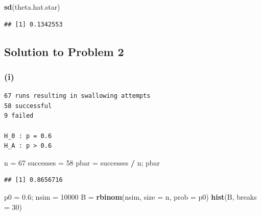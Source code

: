 \documentclass[]{article}
\newenvironment{Shaded}{\begin{snugshade}}{\end{snugshade}}
\newcommand{\DataTypeTok}[1]{\textcolor[rgb]{0.13,0.29,0.53}{#1}}
\newcommand{\DecValTok}[1]{\textcolor[rgb]{0.00,0.00,0.81}{#1}}
\newcommand{\FloatTok}[1]{\textcolor[rgb]{0.00,0.00,0.81}{#1}}
\newcommand{\KeywordTok}[1]{\textcolor[rgb]{0.13,0.29,0.53}{\textbf{#1}}}
\newcommand{\NormalTok}[1]{#1}
\newcommand{\OperatorTok}[1]{\textcolor[rgb]{0.81,0.36,0.00}{\textbf{#1}}}
\newcommand{\StringTok}[1]{\textcolor[rgb]{0.31,0.60,0.02}{#1}}
\begin{document}
\begin{Shaded}
\begin{Highlighting}[]
\KeywordTok{sd}\NormalTok{(theta.hat.star)}
\end{Highlighting}
\end{Shaded}

\begin{verbatim}
## [1] 0.1342553
\end{verbatim}

\hypertarget{solution-to-problem-2}{%
\subsection{Solution to Problem 2}\label{solution-to-problem-2}}

\hypertarget{i-1}{%
\subsubsection{(i)}\label{i-1}}

\begin{verbatim}
67 runs resulting in swallowing attempts
58 successful
9 failed

H_0 : p = 0.6
H_A : p > 0.6

\end{verbatim}

\begin{Shaded}
\begin{Highlighting}[]
\NormalTok{n =}\StringTok{ }\DecValTok{67}
\NormalTok{successes =}\StringTok{ }\DecValTok{58}
\NormalTok{pbar =}\StringTok{ }\NormalTok{successes }\OperatorTok{/}\StringTok{ }\NormalTok{n; pbar}
\end{Highlighting}
\end{Shaded}

\begin{verbatim}
## [1] 0.8656716
\end{verbatim}

\begin{Shaded}
\begin{Highlighting}[]
\NormalTok{p0 =}\StringTok{ }\FloatTok{0.6}\NormalTok{; nsim =}\StringTok{ }\DecValTok{10000}
\NormalTok{B =}\StringTok{ }\KeywordTok{rbinom}\NormalTok{(nsim, }\DataTypeTok{size =}\NormalTok{ n, }\DataTypeTok{prob =}\NormalTok{ p0)}
\KeywordTok{hist}\NormalTok{(B, }\DataTypeTok{breaks =} \DecValTok{30}\NormalTok{)}
\end{Highlighting}
\end{Shaded}
\end{document}
